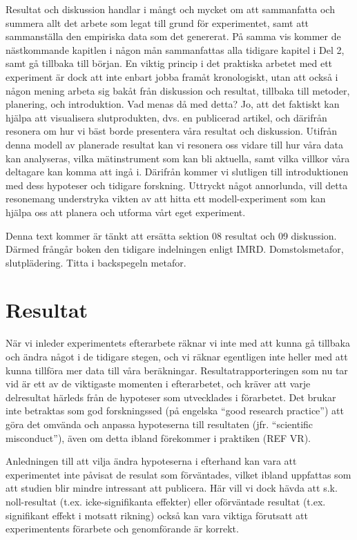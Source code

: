 \documentclass[
]{book}
\begin{document}
Resultat och diskussion handlar i mångt och mycket om att sammanfatta och summera allt det arbete som legat till grund för experimentet, samt att sammanställa den empiriska data som det genererat. På samma vis kommer de nästkommande kapitlen i någon mån sammanfattas alla tidigare kapitel i Del 2, samt gå tillbaka till början. En viktig princip i det praktiska arbetet med ett experiment är dock att inte enbart jobba framåt kronologiskt, utan att också i någon mening arbeta sig bakåt från diskussion och resultat, tillbaka till metoder, planering, och introduktion. Vad menas då med detta? Jo, att det faktiskt kan hjälpa att visualisera slutprodukten, dvs. en publicerad artikel, och därifrån resonera om hur vi bäst borde presentera våra resultat och diskussion. Utifrån denna modell av planerade resultat kan vi resonera oss vidare till hur våra data kan analyseras, vilka mätinstrument som kan bli aktuella, samt vilka villkor våra deltagare kan komma att ingå i. Därifrån kommer vi slutligen till introduktionen med dess hypoteser och tidigare forskning. Uttryckt något annorlunda, vill detta resonemang understryka vikten av att hitta ett modell-experiment som kan hjälpa oss att planera och utforma vårt eget experiment.

Denna text kommer är tänkt att ersätta sektion 08 resultat och 09 diskussion. Därmed frångår boken den tidigare indelningen enligt IMRD. Domstolsmetafor, slutplädering. Titta i backspegeln metafor.

\hypertarget{sec08.1}{%
\section{Resultat}\label{sec08.1}}

När vi inleder experimentets efterarbete räknar vi inte med att kunna gå tillbaka och ändra något i de tidigare stegen, och vi räknar egentligen inte heller med att kunna tillföra mer data till våra beräkningar. Resultatrapporteringen som nu tar vid är ett av de viktigaste momenten i efterarbetet, och kräver att varje delresultat härleds från de hypoteser som utvecklades i förarbetet. Det brukar inte betraktas som god forskningssed (på engelska ``good research practice'') att göra det omvända och anpassa hypoteserna till resultaten (jfr. ``scientific misconduct''), även om detta ibland förekommer i praktiken (REF VR).

Anledningen till att vilja ändra hypoteserna i efterhand kan vara att experimentet inte påvisat de resulat som förväntades, vilket ibland uppfattas som att studien blir mindre intressant att publicera. Här vill vi dock hävda att s.k. noll-resultat (t.ex. icke-signifikanta effekter) eller oförväntade resultat (t.ex. signifikant effekt i motsatt rikning) också kan vara viktiga förutsatt att experimentents förarbete och genomförande är korrekt.
\end{document}
